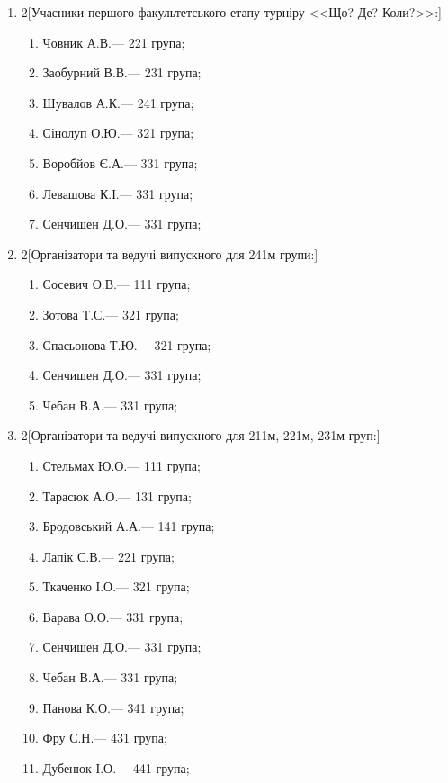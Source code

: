 \documentclass[
	a4paper,
	12pt,
	oneside,
	draft
]{extreport}
\begin{document}
\begin{enumerate}[topsep=0pt,itemsep=-1ex,partopsep=1ex,parsep=1ex]
\item 
\begin{multicols}{2}[Учасники першого факультетського етапу турніру <<Що? Де? Коли?>>:] 
\begin{enumerate}[topsep=0pt,itemsep=-1ex,partopsep=1ex,parsep=1ex,label=\arabic*.]
\item Човник А.В.\hfill --- 221 група;
\item Заобурний В.В.\hfill --- 231 група;
\item Шувалов А.К.\hfill --- 241 група;
\item Сінолуп О.Ю.\hfill --- 321 група;
\item Воробйов Є.А.\hfill --- 331 група;
\item Левашова К.І.\hfill --- 331 група;
\item Сенчишен Д.О.\hfill --- 331 група;
\end{enumerate}
\end{multicols}

\item 
\begin{multicols}{2}[Організатори та ведучі випускного для 241м групи:] 
\begin{enumerate}[topsep=0pt,itemsep=-1ex,partopsep=1ex,parsep=1ex,label=\arabic*.]
\item Сосевич О.В.\hfill --- 111 група;
\item Зотова Т.С.\hfill --- 321 група;
\item Спасьонова Т.Ю.\hfill --- 321 група;
\item Сенчишен Д.О.\hfill --- 331 група;
\item Чебан В.А.\hfill --- 331 група;
\end{enumerate}
\end{multicols}

\item 
\begin{multicols}{2}[Організатори та ведучі випускного для 211м, 221м, 231м груп:] 
\begin{enumerate}[topsep=0pt,itemsep=-1ex,partopsep=1ex,parsep=1ex,label=\arabic*.]
\item Стельмах Ю.О.\hfill --- 111 група;
\item Тарасюк А.О.\hfill --- 131 група;
\item Бродовський А.А.\hfill --- 141 група;
\item Лапік С.В.\hfill --- 221 група;
\item Ткаченко І.О.\hfill --- 321 група;
\item Варава О.О.\hfill --- 331 група;
\item Сенчишен Д.О.\hfill --- 331 група;
\item Чебан В.А.\hfill --- 331 група;
\item Панова К.О.\hfill --- 341 група;
\item Фру С.Н.\hfill --- 431 група;
\item Дубенюк І.О.\hfill --- 441 група;
\end{enumerate}
\end{multicols}


\end{enumerate}
\end{document}
